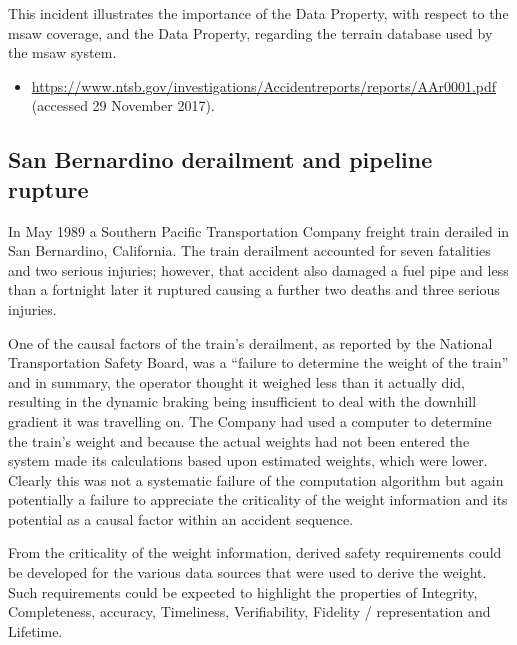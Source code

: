 This incident illustrates the importance of the  Data Property, with respect to the \gls{msaw} coverage, and the  Data Property,
regarding
the terrain database used by the \gls{msaw} system.

\begin{samepage}
\begin{itemize}
	\item \raggedright{\href{https://www.ntsb.gov/investigations/Accidentreports/reports/AAr0001.pdf}{https://www.ntsb.gov/investigations/Accidentreports/reports/AAr0001.pdf} (accessed 29 November 2017).}
\end{itemize}
\end{samepage}

\subsection{San Bernardino derailment and pipeline rupture} \label{bkm:incacc:sanbernardino}
In May 1989 a Southern Pacific Transportation Company freight train derailed in San Bernardino, California. The train derailment accounted for seven fatalities and two serious injuries; however, that accident also damaged a fuel pipe and less than a fortnight later it ruptured causing a further two deaths and three serious injuries.

One of the causal factors of the train’s derailment, as reported by the National Transportation Safety Board, was a ``failure to determine the weight of the train'' and in summary, the operator thought it weighed less than it actually did, resulting in the dynamic braking being insufficient to deal with the downhill gradient it was travelling on. The Company had used a computer to determine the train’s weight and because the actual weights had not been entered the system made its calculations based upon estimated weights, which were lower. Clearly this was not a systematic failure of the computation algorithm but again potentially a failure to appreciate the criticality of the weight information and its potential as a causal factor within an accident sequence.

From the criticality of the weight information, derived safety requirements could be developed for the various data sources that were used to derive the weight. Such requirements could be expected to highlight the properties of Integrity, Completeness, \gls{accuracy}, Timeliness, Verifiability, Fidelity / representation and Lifetime.

